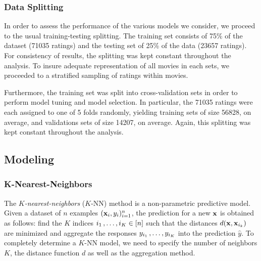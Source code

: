 \documentclass[bj, preprint]{imsart}
\begin{document}
\subsubsection{Data Splitting}\label{subsubsec:method.preprocess.split}

In order to assess the performance of the various models we consider, we proceed to the usual training-testing splitting. 
The training set consists of 75\% of the dataset (\num{71035} ratings) and the testing set of 25\% of the data (\num{23657} ratings). 
For consistency of results, the splitting was kept constant throughout the analysis.
To insure adequate representation of all movies in each sets, we proceeded to a stratified sampling of ratings within movies.

Furthermore, the training set was split into cross-validation sets in order to perform model tuning and model selection. 
In particular, the \num{71035} ratings were each assigned to one of 5 folds randomly, yielding training sets of size \num{56828}, on average, and validations sets of size \num{14207}, on average. 
Again, this splitting was kept constant throughout the analysis.

\subsection{Modeling}\label{subsec:method.models}

\subsubsection{K-Nearest-Neighbors}\label{subsubsec:method.models.knn}

The \textit{$K$-nearest-neighbors} ($K$-NN) method is a non-parametric predictive model. 
Given a dataset of $n$ examples $(\operatorname{\mathbf x}_i, y_i)_{i=1}^n$, the prediction for a new $\operatorname{\mathbf x}$ is obtained as follows: find the $K$ indices $i_1\operatorname{,\ldots ,} i_K\in[n]$ such that the distances $d(\operatorname{\mathbf x}, \operatorname{\mathbf x}_{i_k})$ are minimized and aggregate the responses $y_{i_1}\operatorname{,\ldots ,} y_{i_K}$ into the prediction $\hat{y}$.
To completely determine a $K$-NN model, we need to specify the number of neighbors $K$, the distance function $d$ as well as the aggregation method.

\end{document}
